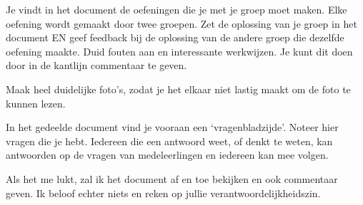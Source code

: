 Je vindt in het document de oefeningen die je met je groep moet maken. Elke oefening wordt gemaakt door twee groepen. Zet de oplossing van je groep in het document EN geef feedback bij de oplossing van de andere groep die dezelfde oefening maakte. Duid fouten aan en interessante werkwijzen. Je kunt dit doen door in de kantlijn commentaar te geven. 

Maak heel duidelijke foto’s, zodat je het elkaar niet lastig maakt om de foto te kunnen lezen.

In het gedeelde document vind je vooraan een `vragenbladzijde'. Noteer hier vragen die je hebt. Iedereen die een antwoord weet, of denkt te weten, kan antwoorden op de vragen van medeleerlingen en iedereen kan mee volgen. 

Als het me lukt, zal ik het document af en toe bekijken en ook commentaar geven. Ik beloof echter niets en reken op jullie verantwoordelijkheidszin.

\eindewerktekst

